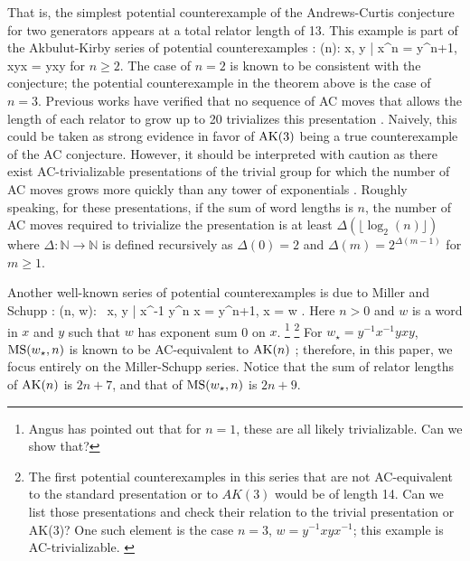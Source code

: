 That is, the simplest potential counterexample of the Andrews-Curtis conjecture for two generators
appears at a total relator length of 13. This example is part of the Akbulut-Kirby series of potential counterexamples \cite{Akbulut-Kirby}:
\bea
\AK(n): \langle x, y | x^n = y^{n+1}, xyx = yxy\rangle
\eea
for $n \geq 2.$ The case of $n=2$ is known to be consistent with the conjecture; the potential counterexample
in the theorem above is the case of $n=3$. Previous works have verified that no sequence of AC moves that allows the length of each relator to grow up to 20 trivializes this presentation \cite{Panteleev-Ushakov}. Naively, this could be taken as strong evidence in favor of $\text{AK}(3)$ being a true counterexample of the AC conjecture. However, it should be interpreted with caution as there exist AC-trivializable presentations of the trivial group for which the number of AC moves grows more quickly than any tower of exponentials \cite{Bridson, Lishak}. Roughly speaking, for these presentations, if the sum of word lengths is $n$, the number of AC moves required to trivialize the presentation is at least $\Delta (\lfloor \log_2 (n) \rfloor)$ where $\Delta : \mathbb{N} \to \mathbb{N}$ is defined recursively as $\Delta(0) = 2$ and $\Delta (m) = 2^{\Delta(m-1)}$ for $m \geq 1$.
\newline

Another well-known series of potential counterexamples is due to Miller and Schupp \cite{Miller-Schupp}:
\bea
\MS(n, w): \ \langle x, y | x^{-1} y^n x = y^{n+1}, x = w \rangle.
\eea
Here $n > 0$ and $w$ is a word in $x$ and $y$ such that $w$ has exponent sum 0
on $x$.
\footnote{Angus has pointed out that for $n=1$, these are all likely trivializable. Can we show that?
	 }
\footnote{The first potential counterexamples in this series that are not AC-equivalent to the
	standard presentation or to $AK(3)$ would be of length 14. Can we list those presentations and
	check their relation to the trivial presentation or AK(3)? One such element is the case $n=3$,
	$w = y^{-1} x y x^{-1}$; this example is AC-trivializable. \cite{morse}}
For $w_\star = y^{-1} x^{-1} y x y$, $\text{MS}(w_\star, n)$ is known to be AC-equivalent to $\text{AK}(n)$ \cite{MMS}; therefore, in this paper, we focus entirely on the Miller-Schupp series.
Notice that the sum of relator lengths of $\text{AK}(n)$ is $2n+7$, and that of $\text{MS}(w_\star, n)$ is $2n+9$.
\newline

